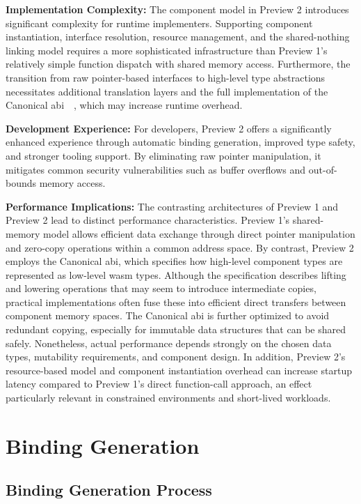 \textbf{Implementation Complexity:} The component model in Preview 2 introduces significant complexity for runtime implementers. Supporting component instantiation, interface resolution, resource management, and the shared-nothing linking model requires a more sophisticated infrastructure than Preview 1’s relatively simple function dispatch with shared memory access. Furthermore, the transition from raw pointer-based interfaces to high-level type abstractions necessitates additional translation layers and the full implementation of the Canonical \acrfull{abi}~\cite{abi}~\cite{cabi}, which may increase runtime overhead.

\textbf{Development Experience:} For developers, Preview 2 offers a significantly enhanced experience through automatic binding generation, improved type safety, and stronger tooling support. By eliminating raw pointer manipulation, it mitigates common security vulnerabilities such as buffer overflows and out-of-bounds memory access.

\textbf{Performance Implications:} The contrasting architectures of Preview 1 and Preview 2 lead to distinct performance characteristics. Preview 1’s shared-memory model allows efficient data exchange through direct pointer manipulation and zero-copy operations within a common address space. By contrast, Preview 2 employs the Canonical \acrshort{abi}, which specifies how high-level component types are represented as low-level \acrshort{wasm} types. Although the specification describes lifting and lowering operations that may seem to introduce intermediate copies, practical implementations often fuse these into efficient direct transfers between component memory spaces. The Canonical \acrshort{abi} is further optimized to avoid redundant copying, especially for immutable data structures that can be shared safely. Nonetheless, actual performance depends strongly on the chosen data types, mutability requirements, and component design. In addition, Preview 2’s resource-based model and component instantiation overhead can increase startup latency compared to Preview 1’s direct function-call approach, an effect particularly relevant in constrained environments and short-lived workloads.

\section{Binding Generation}
\label{sec:wit-binding}

\subsection{Binding Generation Process}
\label{subsec:binding-generation}

